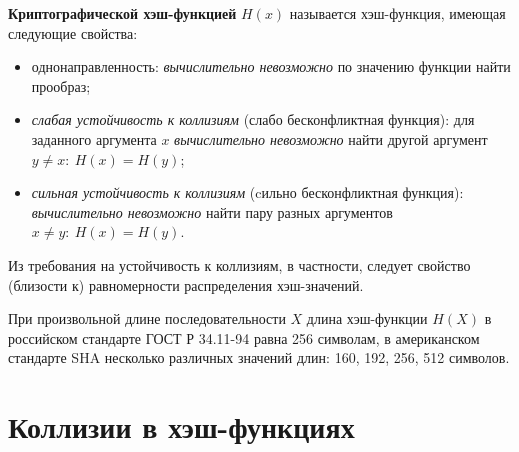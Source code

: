 \textbf{Криптографической хэш-функцией} $H(x)$ называется хэш-функция, имеющая следующие свойства:
\begin{itemize}
    \item однонаправленность: \emph{вычислительно невозможно} по значению функции найти прообраз;
    \item \emph{слабая устойчивость к коллизиям} (слабо бесконфликтная функция): для заданного аргумента $x$ \emph{вычислительно невозможно} найти другой аргумент $y \neq x: ~ H(x) = H(y)$;
    \item \emph{сильная устойчивость к коллизиям} (cильно бесконфликтная функция): \emph{вычислительно невозможно} найти пару разных аргументов $x \neq y: ~ H(x) = H(y)$.
\end{itemize}

Из требования на устойчивость к коллизиям, в частности, следует свойство (близости к) равномерности распределения хэш-значений.

При произвольной длине последовательности $X$ длина хэш-функции $H(X)$ в российском стандарте ГОСТ Р 34.11-94 равна 256 символам, в американском стандарте SHA несколько различных значений длин: 160, 192, 256, 512 символов.







\section{Коллизии в хэш-функциях}




